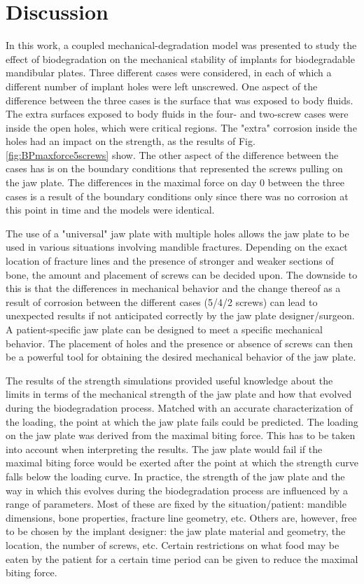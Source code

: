 \section{Discussion}

In this work, a coupled mechanical-degradation model was presented to study the effect of biodegradation on the mechanical stability of implants for biodegradable mandibular plates. Three different cases were considered, in each of which a different number of implant holes were left unscrewed. One aspect of the difference between the three cases is the surface that was exposed to body fluids. The extra surfaces exposed to body fluids in the four- and two-screw cases were inside the open holes, which were critical regions. The "extra" corrosion inside the holes had an impact on the strength, as the results of Fig. \ref{fig:BPmaxforce5screws} show. The other aspect of the difference between the cases has is on the boundary conditions that represented the screws pulling on the jaw plate. The differences in the maximal force on day 0 between the three cases is a result of the boundary conditions only since there was no corrosion at this point in time and the models were identical.

The use of a "universal" jaw plate with multiple holes allows the jaw plate to be used in various situations involving mandible fractures. Depending on the exact location of fracture lines and the presence of stronger and weaker sections of bone, the amount and placement of screws can be decided upon. The downside to this is that the differences in mechanical behavior and the change thereof as a result of corrosion between the different cases (5/4/2 screws) can lead to unexpected results if not anticipated correctly by the jaw plate designer/surgeon. A patient-specific jaw plate can be designed to meet a specific mechanical behavior. The placement of holes and the presence or absence of screws can then be a powerful tool for obtaining the desired mechanical behavior of the jaw plate.

The results of the strength simulations provided useful knowledge about the limits in terms of the mechanical strength of the jaw plate and how that evolved during the biodegradation process. Matched with an accurate characterization of the loading, the point at which the jaw plate fails could be predicted. The loading on the jaw plate was derived from the maximal biting force. This has to be taken into account when interpreting the results. The jaw plate would fail if the maximal biting force would be exerted after the point at which the strength curve falls below the loading curve. In practice, the strength of the jaw plate and the way in which this evolves during the biodegradation process are influenced by a range of parameters. Most of these are fixed by the situation/patient: mandible dimensions, bone properties, fracture line geometry, etc. Others are, however, free to be chosen by the implant designer: the jaw plate material and geometry, the location, the number of screws, etc. Certain restrictions on what food may be eaten by the patient for a certain time period can be given to reduce the maximal biting force.

